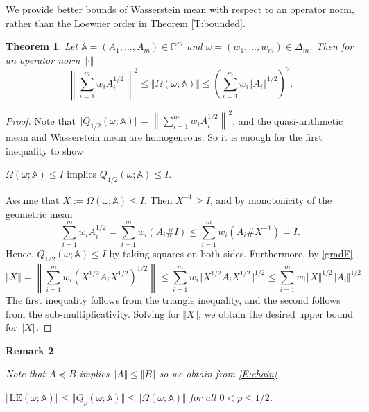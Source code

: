 \documentclass[12pt,reqno]{amsart}
\newtheorem{theorem}{Theorem}[section]
\newtheorem{Remark}[theorem]{Remark}
\newenvironment{remark}{\begin{Remark}\begin{em}}{\end{em}\end{Remark}}
\begin{document}
We provide better bounds of Wasserstein mean with respect to an operator norm, rather than the Loewner order in Theorem \ref{T:bounded}.
\begin{theorem}
Let $\mathbb{A} = (A_1, \ldots, A_m) \in \mathbb{P}^m$ and $\omega = (w_{1}, \dots, w_{m}) \in \Delta_{m}$. Then for an operator norm $\Vert \cdot \Vert$
\begin{displaymath}
\left\| \sum_{i=1}^{m} w_{i} A_{i}^{1/2} \right\|^{2} \leq \Vert \Omega(\omega; \mathbb{A}) \Vert \leq \left( \sum_{i=1}^{m} w_{i} \Vert A_{i} \Vert^{1/2} \right)^{2}.
\end{displaymath}
\end{theorem}

\begin{proof}
Note that $\displaystyle \Vert Q_{1/2}(\omega; \mathbb{A}) \Vert = \left\| \sum_{i=1}^{m} w_{i} A_{i}^{1/2} \right\|^{2}$, and the quasi-arithmetic mean and Wasserstein mean are homogeneous. So it is enough for the first inequality to show
\begin{center}
$\Omega(\omega; \mathbb{A}) \leq I$ \quad implies \quad $Q_{1/2}(\omega; \mathbb{A}) \leq I$.
\end{center}
Assume that $X := \Omega(\omega; \mathbb{A}) \leq I$. Then $X^{-1} \geq I$, and by monotonicity of the geometric mean
\begin{displaymath}
\sum_{i=1}^{m} w_{i} A_{i}^{1/2} = \sum_{i=1}^{m} w_{i} (A_{i} \# I) \leq \sum_{i=1}^{m} w_{i} (A_{i} \# X^{-1}) = I.
\end{displaymath}
Hence, $Q_{1/2}(\omega; \mathbb{A}) \leq I$ by taking squares on both sides. Furthermore, by \eqref{gradF}
\begin{displaymath}
\Vert X \Vert = \left\| \sum_{i=1}^{m} w_{i} (X^{1/2} A_{i} X^{1/2})^{1/2} \right\| \leq \sum_{i=1}^{m} w_{i} \Vert X^{1/2} A_{i} X^{1/2} \Vert^{1/2} \leq \sum_{i=1}^{m} w_{i} \Vert X \Vert^{1/2} \Vert A_{i} \Vert^{1/2}.
\end{displaymath}
The first inequality follows from the triangle inequality, and the second follows from the sub-multiplicativity.
Solving for $\Vert X \Vert$, we obtain the desired upper bound for $\Vert X \Vert$.
\end{proof}

\begin{remark}
Note that $A \preceq B$ implies $\Vert A \Vert \leq \Vert B \Vert$ so we obtain from \eqref{E:chain}
\begin{center}
$\Vert \mathrm{LE}(\omega; \mathbb{A}) \Vert \leq \Vert Q_{p}(\omega; \mathbb{A}) \Vert \leq \Vert \Omega(\omega; \mathbb{A}) \Vert$ \quad for all $0 < p \leq 1/2$.
\end{center}
\end{remark}
\end{document}
